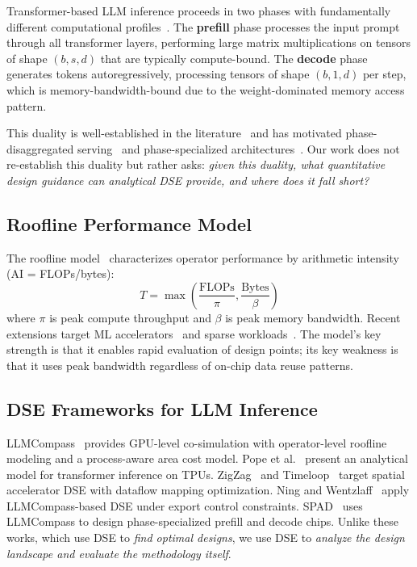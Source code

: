 \documentclass[sigconf,10pt]{acmart}
\begin{document}
Transformer-based LLM inference proceeds in two phases with fundamentally
different computational profiles~\cite{splitwise2024,pope2023efficiently}.
The \textbf{prefill} phase processes the input prompt through all
transformer layers, performing large matrix multiplications on tensors of
shape $(b, s, d)$ that are typically compute-bound. The \textbf{decode}
phase generates tokens autoregressively, processing tensors of shape
$(b, 1, d)$ per step, which is memory-bandwidth-bound due to the
weight-dominated memory access pattern.

This duality is well-established in the
literature~\cite{splitwise2024,distserve2024,spad2025} and has motivated
phase-disaggregated serving~\cite{splitwise2024,distserve2024,mooncake2024}
and phase-specialized architectures~\cite{spad2025}. Our work does not
re-establish this duality but rather asks: \emph{given this duality, what
quantitative design guidance can analytical DSE provide, and where does
it fall short?}

\subsection{Roofline Performance Model}

The roofline model~\cite{williams2009roofline} characterizes operator
performance by arithmetic intensity (AI = FLOPs/bytes):
\begin{equation}
T = \max\left(\frac{\text{FLOPs}}{\pi}, \frac{\text{Bytes}}{\beta}\right)
\end{equation}
where $\pi$ is peak compute throughput and $\beta$ is peak memory
bandwidth. Recent extensions target ML
accelerators~\cite{verhelst2025rooflines} and sparse
workloads~\cite{shinn2023sparsity}. The model's key strength is that it
enables rapid evaluation of design points; its key weakness is that it
uses peak bandwidth regardless of on-chip data reuse patterns.

\subsection{DSE Frameworks for LLM Inference}

LLMCompass~\cite{llmcompass} provides GPU-level co-simulation with
operator-level roofline modeling and a process-aware area cost model.
Pope et al.~\cite{pope2023efficiently} present an analytical model for
transformer inference on TPUs. ZigZag~\cite{zigzag2021} and
Timeloop~\cite{parashar2019timeloop} target spatial accelerator DSE with
dataflow mapping optimization. Ning and Wentzlaff~\cite{ning2025sanctions}
apply LLMCompass-based DSE under export control constraints.
SPAD~\cite{spad2025} uses LLMCompass to design phase-specialized prefill
and decode chips. Unlike these works, which use DSE to \emph{find optimal
designs}, we use DSE to \emph{analyze the design landscape and evaluate
the methodology itself}.
\end{document}
